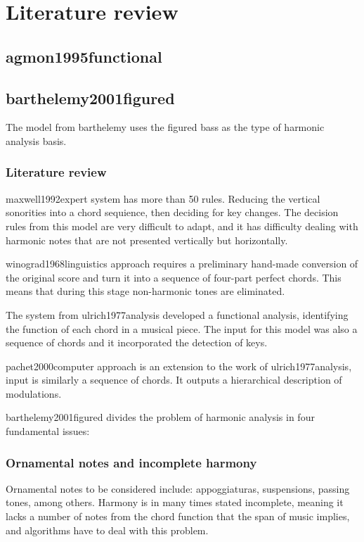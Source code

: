 \normallinespacing

\chapter{Literature review}

	\section{agmon1995functional }
	\section{barthelemy2001figured }
	The model from barthelemy uses the figured bass as the type of harmonic analysis basis.

	\subsection{Literature review}
		maxwell1992expert system has more than 50 rules. Reducing the vertical sonorities into a chord sequience, then deciding for key changes. The decision rules from this model are very difficult to adapt, and it has difficulty dealing with harmonic notes that are not presented vertically but horizontally.

		winograd1968linguistics approach requires a preliminary hand-made conversion of the original score and turn it into a sequence of four-part perfect chords. This means that during this stage non-harmonic tones are eliminated.

		The system from ulrich1977analysis developed a functional analysis, identifying the function of each chord in a musical piece. The input for this model was also a sequence of chords and it incorporated the detection of keys.

		pachet2000computer approach is an extension to the work of ulrich1977analysis, input is similarly a sequence of chords. It outputs a hierarchical description of modulations.

	barthelemy2001figured divides the problem of harmonic analysis in four fundamental issues:
	\subsection{Ornamental notes and incomplete harmony}
			Ornamental notes to be considered include: appoggiaturas, suspensions, passing tones, among others.
			Harmony is in many times stated incomplete, meaning it lacks a number of notes from the chord function that the span of music implies, and algorithms have to deal with this problem.
